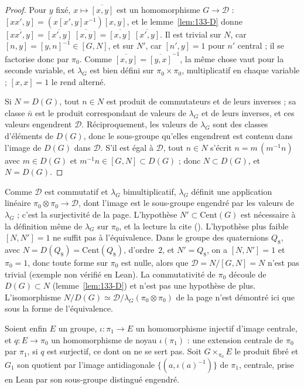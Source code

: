 \begin{proof}
Pour $y$ fixé, $x \mapsto \overline{[x, y]}$ est un homomorphisme $G \to \mathcal D$ : $[xx', y] = (x[x', y]x^{-1})[x, y]$, et le lemme~\ref{lem:133-D} donne $\overline{[xx', y]} = \overline{[x', y]}\;\overline{[x, y]} = \overline{[x, y]}\;\overline{[x', y]}$. Il est trivial sur $N$, car $[n, y] = [y, n]^{-1} \in [G, N]$, et sur $N'$, car $[n', y] = 1$ pour $n'$ central ; il se factorise donc par $\pi_0$. Comme $\overline{[x, y]} = \overline{[y, x]}^{-1}$, la même chose vaut pour la seconde variable, et $\lambda_G$ est bien défini sur $\pi_0 \times \pi_0$, multiplicatif en chaque variable ; $[x, x] = 1$ le rend alterné.

Si $N = D(G)$, tout $n \in N$ est produit de commutateurs et de leurs inverses ; sa classe $\bar n$ est le produit correspondant de valeurs de $\lambda_G$ et de leurs inverses, et ces valeurs engendrent $\mathcal D$. Réciproquement, les valeurs de $\lambda_G$ sont des classes d'éléments de $D(G)$, donc le sous-groupe qu'elles engendrent est contenu dans l'image de $D(G)$ dans $\mathcal D$. S'il est égal à $\mathcal D$, tout $n \in N$ s'écrit $n = m\,(m^{-1}n)$ avec $m \in D(G)$ et $m^{-1}n \in [G, N] \subset D(G)$ ; donc $N \subset D(G)$, et $N = D(G)$.
\end{proof}

\begin{remarque}
Comme $\mathcal D$ est commutatif et $\lambda_G$ bimultiplicatif, $\lambda_G$ définit une application linéaire $\pi_0 \otimes \pi_0 \to \mathcal D$, dont l'image est le sous-groupe engendré par les valeurs de $\lambda_G$ ; c'est la surjectivité de la page. L'hypothèse $N' \subset \mathrm{Cent}(G)$ est nécessaire à la définition même de $\lambda_G$ sur $\pi_0$, et la lecture la cite (). L'hypothèse plus faible $[N, N'] = 1$ ne suffit pas à l'équivalence. Dans le groupe des quaternions $Q_8$, avec $N = D(Q_8) = \mathrm{Cent}(Q_8)$, d'ordre~$2$, et $N' = Q_8$, on a $[N, N'] = 1$ et $\pi_0 = 1$, donc toute forme sur $\pi_0$ est nulle, alors que $\mathcal D = N/[G, N] = N$ n'est pas trivial (exemple non vérifié en Lean). La commutativité de $\pi_0$ découle de $D(G) \subset N$ (lemme~\ref{lem:133-D}) et n'est pas une hypothèse de plus. L'isomorphisme $N/D(G) \simeq \mathcal D/\lambda_G(\pi_0 \otimes \pi_0)$ de la page n'est démontré ici que sous la forme de l'équivalence.
\end{remarque}

Soient enfin $E$ un groupe, $\iota : \pi_1 \to E$ un homomorphisme injectif d'image centrale, et $q : E \to \pi_0$ un homomorphisme de noyau $\iota(\pi_1)$ : une extension centrale de $\pi_0$ par $\pi_1$, si $q$ est surjectif, ce dont on ne se sert pas. Soit $G \times_{\pi_0} E$ le produit fibré et $G_1$ son quotient par l'image antidiagonale $\{(a, \iota(a)^{-1})\}$ de $\pi_1$, centrale, prise en Lean par son sous-groupe distingué engendré.

